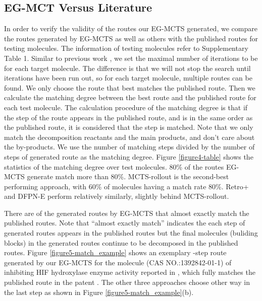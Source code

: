 \documentclass[sn-mathphys,Numbered]{sn-jnl}
\begin{document}
\subsection{EG-MCT Versus Literature}
In order to verify the validity of the routes our EG-MCTS generated, we compare the routes generated by EG-MCTS as well as others with the published routes for  testing molecules. The information of  testing molecules refer to Supplementary Table 1. Similar to previous work \cite{retro2020,2022}, we set the maximal number of iterations to be  for each target molecule. The difference is that we will not stop the search until  iterations have been run out, so for each target molecule, multiple routes can be found. We only choose the route that best matches the published route.
Then we calculate the matching degree between the best route and the published route for each test molecule.
The calculation procedure of the matching degree is that if the step of the route appears in the published route, and is in the same order as the published route, it is considered that the step is matched. Note that we only match the decomposition reactants and the main products, and don't care about the by-products. We use the number of matching steps divided by the number of steps of generated route as the matching degree. Figure \ref{figure4-table} shows the statistics of the matching degree over  test molecules. 
80\% of the routes EG-MCTS generate match more than 80\%.
MCTS-rollout is the second-best performing approach, with 60\% of molecules having a match rate  80\%. Retro+ and DFPN-E perform relatively similarly, slightly behind MCTS-rollout.




There are  of the generated routes by EG-MCTS that almost exactly match the published routes. Note that ``almost exactly match'' indicates the each step of generated routes appears in the published routes but the final molecules (buliding blocks) in the generated routes continue to be decomposed in the published routes. Figure \ref{figure5-match_example} shows an exemplary -step route generated by our EG-MCTS for the molecule (CAS NO.:1392842-01-1) of inhibiting HIF hydroxylase enzyme activity reported in , which fully matches the published route in the patent \citep{paten-thesame}.
The other three approaches choose other way in the last step as shown in Figure \ref{figure5-match_example}(b).
\end{document}
